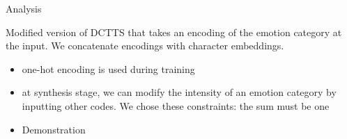 \documentclass[final]{beamer}
\newlength{\onecolwid}
\newcommand{\fatskip}{\vspace{3cm}}
\begin{document}
\begin{frame}[t]
\begin{columns}[t]
\begin{column}{\onecolwid}

\fatskip
\begin{block}{Analysis}



Modified version of DCTTS that takes an encoding of the emotion category at the input. We concatenate encodings with character embeddings.
\begin{itemize}
    \item one-hot encoding is used during training
    \item at synthesis stage, we can modify the intensity of an emotion category by inputting other codes. We chose these constraints: the sum must be one
    \item Demonstration
    
\end{itemize}

\end{block}





\end{column}
\end{columns}
\end{frame}
\end{document}
